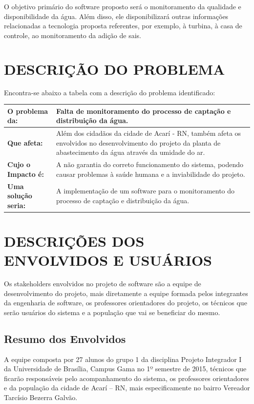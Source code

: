   O objetivo primário do software proposto será o monitoramento da qualidade e disponibilidade da água. Além disso, ele 
  disponibilizará outras informações relacionadas a tecnologia proposta referentes, por exemplo, à turbina, à casa de 
  controle, ao monitoramento da adição de sais.
  
  \section{DESCRIÇÃO DO PROBLEMA}
  Encontra-se abaixo a tabela com a descrição do problema identificado:
  
   \begin{longtable}{|m{5.0cm}|m{11.2cm}|}
  \hline
\textbf{O problema da:} & Falta de monitoramento do processo de captação e distribuição da água.\\
  \hline
\textbf{Que afeta:} & Além dos cidadãos da cidade de Acarí - RN, também afeta os envolvidos no desenvolvimento do projeto da planta de abastecimento da água através da umidade do ar.\\
  \hline
\textbf{Cujo o Impacto é:} & A não garantia do correto funcionamento do sistema, podendo causar problemas à saúde humana e a inviabilidade do projeto.\\
  \hline
\textbf{Uma solução seria:} & A implementação de um software para o monitoramento do processo de captação e distribuição da água.\\
  \hline
 \end{longtable}
   
  \section{DESCRIÇÕES DOS ENVOLVIDOS E USUÁRIOS}
  Os stakeholders envolvidos no projeto de software são a equipe de desenvolvimento do projeto, mais diretamente a equipe 
  formada pelos integrantes da engenharia de software, os professores orientadores do projeto, os técnicos que serão usuários 
  do sistema e a população que vai se beneficiar do mesmo.
  
  \subsection{Resumo dos Envolvidos}
  A equipe composta por 27 alunos do grupo 1 da disciplina Projeto Integrador I da Universidade de Brasília, Campus Gama 
  no 1º semestre de 2015, técnicos que ficarão responsáveis pelo acompanhamento do sistema, os professores orientadores e 
  da população da cidade de Acarí – RN, mais especificamente no bairro Vereador Tarcísio Bezerra Galvão.
  
